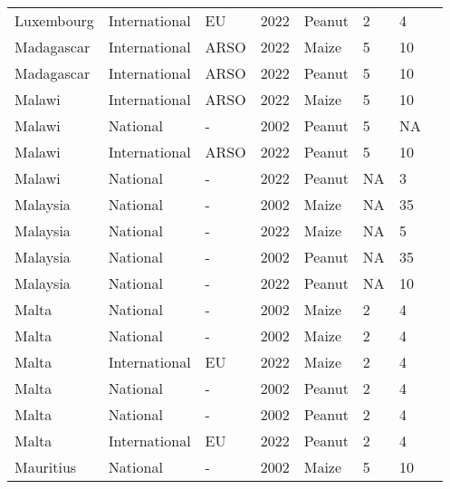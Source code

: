\begin{landscape}
\begin{longtable}[c]{llllllll}
Luxembourg        & International & EU       & 2022 & Peanut & 2  & 4  & \citet{EC2010}               \\
Madagascar        & International & ARSO     & 2022 & Maize  & 5  & 10 & \citet{ARSO2022}             \\
Madagascar        & International & ARSO     & 2022 & Peanut & 5  & 10 & \citet{ARSO2022}             \\
Malawi            & International & ARSO     & 2022 & Maize  & 5  & 10 & \citet{ARSO2022}             \\
Malawi            & National      & -        & 2002 & Peanut & 5  & NA & \citet{van2004worldwide}     \\
Malawi            & International & ARSO     & 2022 & Peanut & 5  & 10 & \citet{ARSO2022}             \\
Malawi            & National      & -        & 2022 & Peanut & NA & 3  & \citet{chilaka2022mycotoxin} \\
Malaysia          & National      & -        & 2002 & Maize  & NA & 35 & \citet{van2004worldwide}     \\
Malaysia          & National      & -        & 2022 & Maize  & NA & 5  & \citet{MOH2014}              \\
Malaysia          & National      & -        & 2002 & Peanut & NA & 35 & \citet{van2004worldwide}     \\
Malaysia          & National      & -        & 2022 & Peanut & NA & 10 & \citet{MOH2014}              \\
Malta             & National      & -        & 2002 & Maize  & 2  & 4  & \citet{van2004worldwide}     \\
Malta             & National      & -        & 2002 & Maize  & 2  & 4  & \citet{van2004worldwide}     \\
Malta             & International & EU       & 2022 & Maize  & 2  & 4  & \citet{EC2010}               \\
Malta             & National      & -        & 2002 & Peanut & 2  & 4  & \citet{van2004worldwide}     \\
Malta             & National      & -        & 2002 & Peanut & 2  & 4  & \citet{van2004worldwide}     \\
Malta             & International & EU       & 2022 & Peanut & 2  & 4  & \citet{EC2010}               \\
Mauritius         & National      & -        & 2002 & Maize  & 5  & 10 & \citet{van2004worldwide}     \\

\end{longtable}
\end{landscape}
